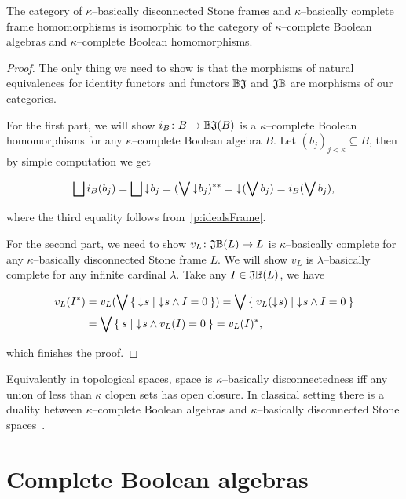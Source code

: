 \begin{theorem*}
    The category of $\kappa$--basically disconnected Stone frames and $\kappa$--basically complete frame homomorphisms is isomorphic to the category of $\kappa$--complete Boolean algebras and $\kappa$--complete Boolean homomorphisms.
\end{theorem*}
\begin{proof}
    The only thing we need to show is that the morphisms of natural equivalences for identity functors and functors $\mathbb{B}\mathfrak{J}$ and $\mathfrak{J}\mathbb{B}$ are morphisms of our categories.

    For the first part, we will show $i_B\colon B \to \mathbb{B}\mathfrak{J}(B)$ is a $\kappa$--complete Boolean homomorphisms for any $\kappa$--complete Boolean algebra $B$. Let $(b_j)_{j < \kappa} \subseteq B$, then by simple computation we get

    $$
        \bigsqcup i_B(b_j) = \bigsqcup \mathord{\downarrow}\mkern1mu b_j = (\bigvee \mathord{\downarrow}\mkern1mu b_j)^{**} = \mathord{\downarrow}\mkern1mu (\bigvee b_j) = i_B(\bigvee b_j),
    $$

    \noindent where the third equality follows from~\ref{p:idealsFrame}.

    For the second part, we need to show $v_L\colon \mathfrak{J}\mathbb{B}(L) \to L$ is $\kappa$--basically complete for any $\kappa$--basically disconnected Stone frame $L$. We will show $v_L$ is $\lambda$--basically complete for any infinite cardinal $\lambda$. Take any $I \in \mathfrak{J}\mathbb{B}(L)$, we have

    \begin{align*}
        v_L(I^*) &= v_L(\bigvee \Set{ \mathord{\downarrow}\mkern1mus | \mathord{\downarrow}\mkern1mus \wedge I = 0 })
                  = \bigvee \Set{ v_L(\mathord{\downarrow}\mkern1mus) | \mathord{\downarrow}\mkern1mus \wedge I = 0 } \\
                 &= \bigvee \Set{ s | \mathord{\downarrow}\mkern1mus \wedge v_L(I) = 0 } = v_L(I)^*,
    \end{align*}

    \noindent which finishes the proof.
\end{proof}

Equivalently in topological spaces, space is $\kappa$--basically disconnectedness iff any union of less than $\kappa$ clopen sets has open closure. In classical setting there is a duality between $\kappa$--complete Boolean algebras and $\kappa$--basically disconnected Stone spaces~\cite{monk1989handbook}.


\section{Complete Boolean algebras}

